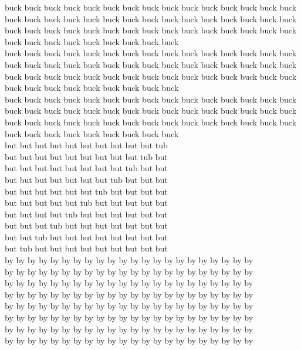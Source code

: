 buck buck buck buck buck buck buck buck buck buck buck buck buck buck buck buck buck buck buck buck buck buck buck buck buck buck buck buck buck buck buck buck buck buck buck buck buck buck buck buck buck buck buck buck buck buck buck buck buck buck buck buck buck buck\\
buck buck buck buck buck buck buck buck buck buck buck buck buck buck buck buck buck buck buck buck buck buck buck buck buck buck buck buck buck buck buck buck buck buck buck buck buck buck buck buck buck buck buck buck buck buck buck buck buck buck buck buck buck buck\\
buck buck buck buck buck buck buck buck buck buck buck buck buck buck buck buck buck buck buck buck buck buck buck buck buck buck buck buck buck buck buck buck buck buck buck buck buck buck buck buck buck buck buck buck buck buck buck buck buck buck buck buck buck buck\\
but but but but but but but but but but tub\\
but but but but but but but but but tub but\\
but but but but but but but but tub but but\\
but but but but but but but tub but but but\\
but but but but but but tub but but but but\\
but but but but but tub but but but but but\\
but but but but tub but but but but but but\\
but but but tub but but but but but but but\\
but but tub but but but but but but but but\\
but tub but but but but but but but but but\\
by by by by by by by by by by by by by by by by by by by by by by\\
by by by by by by by by by by by by by by by by by by by by by by\\
by by by by by by by by by by by by by by by by by by by by by by\\
by by by by by by by by by by by by by by by by by by by by by by\\
by by by by by by by by by by by by by by by by by by by by by by\\
by by by by by by by by by by by by by by by by by by by by by by\\
by by by by by by by by by by by by by by by by by by by by by by\\
by by by by by by by by by by by by by by by by by by by by by by\\
